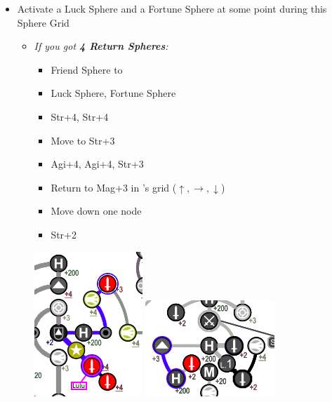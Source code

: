 \begin{spheregrid}
\begin{multicols}{2}
\begin{itemize}
	\item Activate a Luck Sphere and a Fortune Sphere at some point during this Sphere Grid
	\yunaf
	\begin{itemize}
		\item \textit{If you got \textbf{4 Return Spheres}:}
		\begin{itemize}
			\item Friend Sphere to \lulu
			\item Luck Sphere, Fortune Sphere
			\item Str+4, Str+4
			\item Move to Str+3
			\item Agi+4, Agi+4, Str+3
			\item Return to Mag+3 in \wakka's grid ($\uparrow, \rightarrow, \downarrow$)
			\item Move down one node
			\item Str+2
		\end{itemize}
		\includegraphics[width=.5\columnwidth]{graphics/4_returns_w_luck_pt1}
		\newline
		\includegraphics[width=.5\columnwidth]{graphics/4_returns_w_luck_pt2}

\end{itemize}
\end{itemize}
\end{multicols}
\end{spheregrid}
